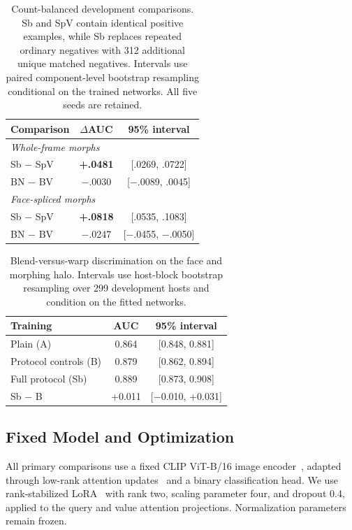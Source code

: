 \documentclass[10pt,twocolumn,letterpaper]{article}
\begin{document}
\begin{table}[t]
\centering
\small
\caption{
Count-balanced development comparisons.
Sb and SpV contain identical positive examples,
while Sb replaces repeated ordinary negatives
with 312 additional unique matched negatives.
Intervals use paired component-level bootstrap
resampling conditional on the trained networks.
All five seeds are retained.
}
\label{tab:count_balanced}
\begin{tabular}{@{}p{1.30in}cc@{}}
\toprule
Comparison & $\Delta$AUC & 95\% interval \\
\midrule
\multicolumn{3}{l}{\textit{Whole-frame morphs}} \\
Sb $-$ SpV
    & \textbf{+.0481} & [.0269, .0722] \\
BN $-$ BV
    & $-$.0030 & [$-$.0089, .0045] \\
\midrule
\multicolumn{3}{l}{\textit{Face-spliced morphs}} \\
Sb $-$ SpV
    & \textbf{+.0818} & [.0535, .1083] \\
BN $-$ BV
    & $-$.0247 & [$-$.0455, $-$.0050] \\
\bottomrule
\end{tabular}
\end{table}

\begin{table}[t]
\centering
\small
\caption{
Blend-versus-warp discrimination on the face and
morphing halo. Intervals use host-block bootstrap
resampling over 299 development hosts and condition
on the fitted networks.
}
\label{tab:blend_controls}
\begin{tabular}{lcc}
\toprule
Training & AUC & 95\% interval \\
\midrule
Plain (A)             & 0.864 & [0.848, 0.881] \\
Protocol controls (B) & 0.879 & [0.862, 0.894] \\
Full protocol (Sb)    & 0.889 & [0.873, 0.908] \\
\midrule
Sb $-$ B & +0.011 & [$-$0.010, +0.031] \\
\bottomrule
\end{tabular}
\end{table}



\subsection{Fixed Model and Optimization}
\label{sec:training_implementation}

All primary comparisons use a fixed CLIP ViT-B/16
image encoder~\cite{radford2021clip}, adapted through
low-rank attention updates~\cite{hu2022lora} and a
binary classification head. We use rank-stabilized
LoRA~\cite{kalajdzievski2023rslora} with rank two,
scaling parameter four, and dropout 0.4, applied
to the query and value attention projections.
Normalization parameters remain frozen.
\end{document}
